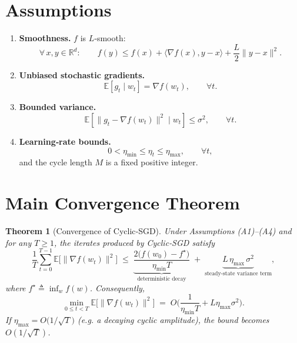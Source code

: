 \documentclass[11pt]{article}
\newtheorem{theorem}{Theorem}
\newcommand{\E}{\mathbb{E}}
\newcommand{\R}{\mathbb{R}}
\begin{document}
\section*{Assumptions}
\begin{enumerate}
    \item \textbf{Smoothness.} $f$ is $L$‑smooth:
    \[
    \forall\,x,y\in\R^{d}:\qquad 
    f(y)\le f(x)+\langle\nabla f(x),y-x\rangle+\frac{L}{2}\|y-x\|^{2}.
    \tag{A1}
    \]
    \item \textbf{Unbiased stochastic gradients.}
    \[
    \E\!\left[g_{t}\mid w_{t}\right]=\nabla f(w_{t}),\qquad\forall t.
    \tag{A2}
    \]
    \item \textbf{Bounded variance.}
    \[
    \E\!\left[\|g_{t}-\nabla f(w_{t})\|^{2}\mid w_{t}\right]\le\sigma^{2},
    \qquad\forall t.
    \tag{A3}
    \]
    \item \textbf{Learning‑rate bounds.}
    \[
    0<\eta_{\min}\le \eta_{t}\le\eta_{\max},\qquad\forall t,
    \tag{A4}
    \]
    and the cycle length $M$ is a fixed positive integer.
\end{enumerate}

\section*{Main Convergence Theorem}
\begin{theorem}[Convergence of Cyclic‑SGD]\label{thm:main}
Under Assumptions (A1)–(A4) and for any $T\ge 1$, the iterates produced by Cyclic‑SGD satisfy
\[
\frac{1}{T}\sum_{t=0}^{T-1}\E\!\big[\|\nabla f(w_{t})\|^{2}\big]
\;\le\;
\underbrace{\frac{2\big(f(w_{0})-f^{\star}\big)}{\eta_{\min}T}}_{\text{deterministic decay}}
\;+\;
\underbrace{L\,\eta_{\max}\,\sigma^{2}}_{\text{steady‑state variance term}},
\tag{1}
\]
where $f^{\star}\triangleq\inf_{w}f(w)$. Consequently,
\[
\min_{0\le t<T}\E\!\big[\|\nabla f(w_{t})\|^{2}\big]
\;=\;O\!\Big(\frac{1}{\eta_{\min}T} + L\eta_{\max}\sigma^{2}\Big).
\]
If $\eta_{\max}=O\!\big(1/\sqrt{T}\big)$ (e.g. a decaying cyclic amplitude), the bound becomes $O(1/\sqrt{T})$.
\end{theorem}

\end{document}
